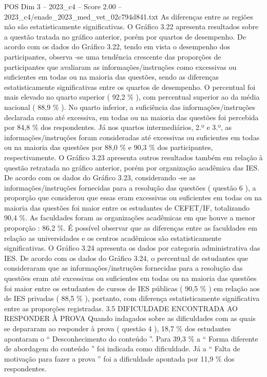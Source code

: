 \begin{textsample}{POS Dim 3 – 2023\_c4 – Score 2.00 – 2023\_c4/enade\_2023\_med\_vet\_02c794d841.txt}
As diferenças entre as regiões não são estatisticamente significativas.
O Gráfico 3.22 apresenta resultados sobre a questão tratada no gráfico anterior, porém por quartos de desempenho.
De acordo com os dados do Gráfico 3.22, tendo em vista o desempenho dos participantes, observa -se uma tendência crescente das proporções de participantes que avaliaram as informações/instruções como excessivas ou suficientes em todas ou na maioria das questões, sendo as diferenças estatisticamente significativas entre os quartos de desempenho.
O percentual foi mais elevado no quarto superior ( 92,2 \% ), com percentual superior ao da média nacional ( 88,9 \% ).
No quarto inferior, a suficiência das informações/instruções declarada como até excessiva, em todas ou na maioria das questões foi percebida por 84,8 \% dos respondentes.
Já nos quartos intermediários, 2.º e 3.º, as informações/instruções foram consideradas até excessivas ou suficientes em todas ou na maioria das questões por 88,0 \% e 90,3 \% dos participantes, respectivamente.
O Gráfico 3.23 apresenta outros resultados também em relação à questão retratada no gráfico anterior, porém por organização acadêmica das IES.
De acordo com os dados do Gráfico 3.23, considerando -se as informações/instruções fornecidas para a resolução das questões ( questão 6 ), a proporção que considerou que essas eram excessivas ou suficientes em todas ou na maioria das questões foi maior entre os estudantes de CEFET/IF, totalizando 90,4 \%.
As faculdades foram as organizações acadêmicas em que houve a menor proporção : 86,2 \%.
É possível observar que as diferenças entre as faculdades em relação as universidades e os centros acadêmicos são estatisticamente significativas.
O Gráfico 3.24 apresenta os dados por categoria administrativa das IES.
De acordo com os dados do Gráfico 3.24, o percentual de estudantes que consideraram que as informações/instruções fornecidas para a resolução das questões eram até excessivas ou suficientes em todas ou na maioria das questões foi maior entre os estudantes de cursos de IES públicas ( 90,5 \% ) em relação aos de IES privadas ( 88,5 \% ), portanto, com diferença estatisticamente significativa entre as proporções registradas. 3.5 DIFICULDADE ENCONTRADA AO RESPONDER À PROVA Quando indagados sobre as dificuldades com as quais se depararam ao responder à prova ( questão 4 ), 18,7 \% dos estudantes apontaram o “ Desconhecimento do conteúdo ”.
Para 39,3 \% a “ Forma diferente de abordagem do conteúdo ” foi indicada como dificuldade.
Já a “ Falta de motivação para fazer a prova ” foi a dificuldade apontada por 11,9 \% dos respondentes.

\end{textsample}
